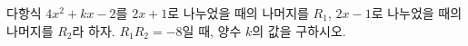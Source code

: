 다항식 $4x^2+kx-2$를 $2x+1$로 나누었을 때의 나머지를 $R_1$, $2x-1$로 나누었을 때의 나머지를 $R_2$라 하자. $R_1R_2=-8$일 때, 양수 $k$의 값을 구하시오.
